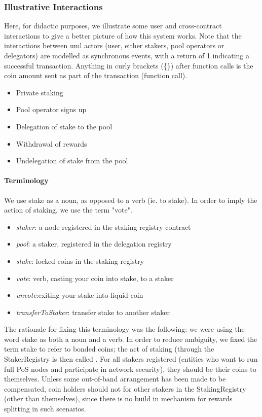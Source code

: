 \subsubsection{Illustrative Interactions}

Here, for didactic purposes, we illustrate some user and cross-contract interactions to give a better picture of how this system works. Note that the interactions between uml actors (user, either stakers, pool operators or delegators) are modelled as synchronous events, with a return of 1 indicating a successful transaction. Anything in curly brackets (\{\}) after function calls is the coin amount sent as part of the transaction (function call).

\begin{itemize}
    \item Private staking
    \item Pool operator signs up
    \item Delegation of stake to the pool
    \item Withdrawal of rewards
    \item Undelegation of stake from the pool
\end{itemize}

\paragraph{Terminology}
We use stake as a noun, as opposed to a verb (ie. to stake). In order to imply the action of staking, we use the term "vote". 
\begin{itemize}
    \item \textit{staker}: a node registered in the staking registry contract 
    \item \textit{pool}: a staker, registered in the delegation registry
    \item \textit{stake}: locked coins in the staking registry
    \item \textit{vote}: verb, casting your coin into stake, to a staker
    \item \textit{unvote}:exiting your stake into liquid coin
    \item \textit{transferToStaker}: transfer stake to another staker
\end{itemize}

The rationale for fixing this terminology was the following: we were using the word stake as both a noun and a verb. In order to reduce ambiguity, we fixed the term stake to refer to bonded coins; the act of staking (through the StakerRegistry is then called . For all stakers registered (entities who want to run full PoS nodes and participate in network security), they should be  their coins to themselves. Unless some out-of-band arrangement has been made to be compensated, coin holders should not  for other stakers in the StakingRegistry (other than themselves), since there is no build in mechanism for rewards splitting in such scenarios. 

